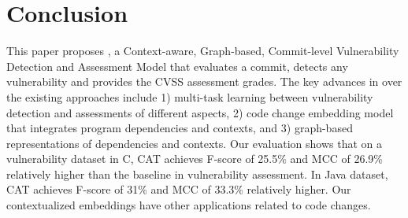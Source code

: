 \section{Conclusion}

This paper proposes {\tool}, a Context-aware, Graph-based,
Commit-level Vulnerability Detection and Assessment Model that
evaluates a commit, detects any vulnerability and provides the CVSS
assessment grades.
The key advances in {\tool} over the existing approaches include 1) multi-task learning between vulnerability
detection and assessments of different aspects, 2) code change
embedding model that integrates program dependencies and contexts, and
3) graph-based representations of dependencies and
contexts. Our evaluation shows that on a vulnerability dataset in C,
CAT achieves F-score of 25.5\% and MCC of 26.9\% relatively higher
than the baseline in vulnerability assessment. In Java dataset, CAT
achieves F-score of 31\% and MCC of 33.3\% relatively higher. Our
contextualized embeddings have other applications related to code
changes.


















